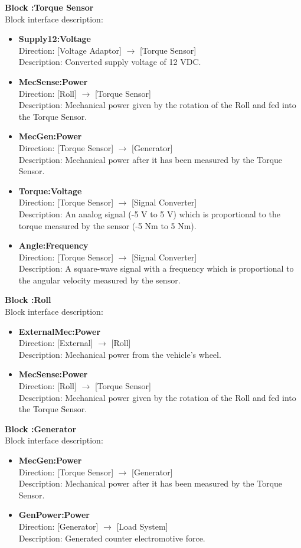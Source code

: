\textbf{Block :Torque Sensor}\\
Block interface description:
\begin{itemize}
	\item \textbf{Supply12:Voltage}\\
	Direction: [Voltage Adaptor] $\rightarrow$ [Torque Sensor]\\
	Description: Converted supply voltage of 12 VDC.
	\item \textbf{MecSense:Power}\\
	Direction: [Roll] $\rightarrow$ [Torque Sensor]\\
	Description: Mechanical power given by the rotation of the Roll and fed into the Torque Sensor.
	\item \textbf{MecGen:Power}\\
	Direction: [Torque Sensor] $\rightarrow$ [Generator]\\
	Description: Mechanical power after it has been measured by the Torque Sensor.
	\item \textbf{Torque:Voltage}\\
	Direction: [Torque Sensor] $\rightarrow$ [Signal Converter]\\
	Description: An analog signal (-5 V to 5 V) which is proportional to the torque measured by the sensor (-5 Nm to 5 Nm).
	\item \textbf{Angle:Frequency}\\
	Direction: [Torque Sensor] $\rightarrow$ [Signal Converter]\\
	Description: A square-wave signal with a frequency which is proportional to the angular velocity measured by the sensor.
\end{itemize}
							
\textbf{Block :Roll}\\
Block interface description:
\begin{itemize}
	\item \textbf{ExternalMec:Power}\\
	Direction: [External] $\rightarrow$ [Roll]\\
	Description: Mechanical power from the vehicle's wheel.
	\item \textbf{MecSense:Power}\\
	Direction: [Roll] $\rightarrow$ [Torque Sensor]\\
	Description: Mechanical power given by the rotation of the Roll and fed into the Torque Sensor.
\end{itemize}
					
\textbf{Block :Generator}\\
Block interface description:
\begin{itemize}
	\item \textbf{MecGen:Power}\\
	Direction: [Torque Sensor] $\rightarrow$ [Generator]\\
	Description: Mechanical power after it has been measured by the Torque Sensor.
	\item \textbf{GenPower:Power}\\
	Direction: [Generator] $\rightarrow$ [Load System]\\
	Description: Generated counter electromotive force.
\end{itemize}
			
